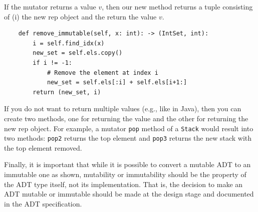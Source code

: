 \documentclass[oneside,11pt,dvipsnames]{book}
\newcommand{\code}[1]{\texttt{#1}}
\begin{document}
If the mutator returns a value $v$, then our new method returns a tuple consisting of (i) the new rep object and the return the value $v$. 
\begin{lstlisting}
    def remove_immutable(self, x: int): -> (IntSet, int):
        i = self.find_idx(x)
        new_set = self.els.copy()
        if i != -1:
            # Remove the element at index i
            new_set = self.els[:i] + self.els[i+1:]  
        return (new_set, i)
\end{lstlisting}

If you do not want to return multiple values (e.g., like in Java), then you can create two methods, one for returning the value and the other for returning the new rep object.
For example, a mutator \code{pop} method of a \code{Stack} would result into two methods: \code{pop2} returns the top element and \code{pop3} returns the new stack with the top element removed.

Finally, it is important that while it is possible to convert a mutable ADT to an immutable one as shown, mutability or immutability should be the property of the ADT type itself, not its implementation. That is, the decision to make an ADT mutable or immutable should be made at the design stage and documented in the ADT specification. 





\end{document}
